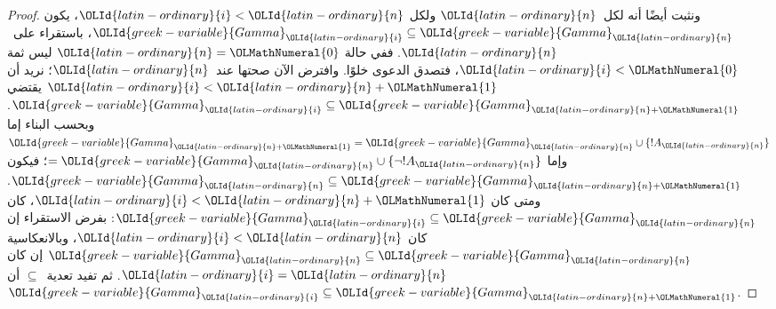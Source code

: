\documentclass[../../../include/open-logic-section]{subfiles}
\begin{document}
\begin{proof}
ونثبت أيضًا أنه لكل~${\OLId{latin-ordinary}{n}}$ ولكل ${\OLId{latin-ordinary}{i}} < {\OLId{latin-ordinary}{n}}$، يكون ${\OLId{greek-variable}{Gamma}}_{\OLId{latin-ordinary}{i}} \subseteq {\OLId{greek-variable}{Gamma}}_{\OLId{latin-ordinary}{n}}$،
باستقراء على~${\OLId{latin-ordinary}{n}}$. ففي حالة ${\OLId{latin-ordinary}{n}}={\OLMathNumeral{0}}$ ليس ثمة ${\OLId{latin-ordinary}{i}} < {\OLMathNumeral{0}}$، فتصدق الدعوى
خلوًا. وافترض الآن صحتها عند~${\OLId{latin-ordinary}{n}}$؛ نريد أن ${\OLId{latin-ordinary}{i}} < {\OLId{latin-ordinary}{n}}+{\OLMathNumeral{1}}$ يقتضي
${\OLId{greek-variable}{Gamma}}_{\OLId{latin-ordinary}{i}} \subseteq {\OLId{greek-variable}{Gamma}}_{{\OLId{latin-ordinary}{n}}+{\OLMathNumeral{1}}}$. وبحسب البناء إما
${\OLId{greek-variable}{Gamma}}_{{\OLId{latin-ordinary}{n}}+{\OLMathNumeral{1}}} = {\OLId{greek-variable}{Gamma}}_{\OLId{latin-ordinary}{n}} \cup \{!A_{\OLId{latin-ordinary}{n}}\}$ وإما $= {\OLId{greek-variable}{Gamma}}_{\OLId{latin-ordinary}{n}} \cup \{\lnot
!A_{\OLId{latin-ordinary}{n}}\}$؛ فيكون ${\OLId{greek-variable}{Gamma}}_{\OLId{latin-ordinary}{n}} \subseteq {\OLId{greek-variable}{Gamma}}_{{\OLId{latin-ordinary}{n}}+{\OLMathNumeral{1}}}$. ومتى كان ${\OLId{latin-ordinary}{i}} < {\OLId{latin-ordinary}{n}}+{\OLMathNumeral{1}}$،
كان ${\OLId{greek-variable}{Gamma}}_{\OLId{latin-ordinary}{i}} \subseteq {\OLId{greek-variable}{Gamma}}_{\OLId{latin-ordinary}{n}}$: بفرض الاستقراء إن كان ${\OLId{latin-ordinary}{i}} < {\OLId{latin-ordinary}{n}}$،
وبالانعكاسية ${\OLId{greek-variable}{Gamma}}_{\OLId{latin-ordinary}{n}} \subseteq {\OLId{greek-variable}{Gamma}}_{\OLId{latin-ordinary}{n}}$ إن كان ${\OLId{latin-ordinary}{i}} = {\OLId{latin-ordinary}{n}}$. ثم تفيد
تعدية~$\subseteq$ أن ${\OLId{greek-variable}{Gamma}}_{\OLId{latin-ordinary}{i}} \subseteq {\OLId{greek-variable}{Gamma}}_{{\OLId{latin-ordinary}{n}}+{\OLMathNumeral{1}}}$.


\end{proof}
\end{document}
